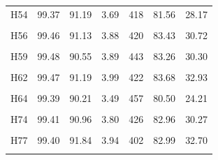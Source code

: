 \documentclass[
  a4paper,
  titlepage]{article}
\begin{document}
\begin{longtable}[t]{lllllll}
H54 & 99.37 & 91.19 & 3.69 & 418 & 81.56 & 28.17\\
 
\cellcolor{gray!6}{H55} & \cellcolor{gray!6}{99.44} & \cellcolor{gray!6}{90.84} & \cellcolor{gray!6}{4.83} & \cellcolor{gray!6}{432} & \cellcolor{gray!6}{87.10} & \cellcolor{gray!6}{43.63}\\
 
H56 & 99.46 & 91.13 & 3.88 & 420 & 83.43 & 30.72\\
 
\cellcolor{gray!6}{H58} & \cellcolor{gray!6}{99.48} & \cellcolor{gray!6}{92.24} & \cellcolor{gray!6}{3.56} & \cellcolor{gray!6}{421} & \cellcolor{gray!6}{82.56} & \cellcolor{gray!6}{28.42}\\
 
H59 & 99.48 & 90.55 & 3.89 & 443 & 83.26 & 30.30\\
 
\cellcolor{gray!6}{H61} & \cellcolor{gray!6}{99.42} & \cellcolor{gray!6}{90.86} & \cellcolor{gray!6}{3.54} & \cellcolor{gray!6}{424} & \cellcolor{gray!6}{80.31} & \cellcolor{gray!6}{24.94}\\
 
H62 & 99.47 & 91.19 & 3.99 & 422 & 83.68 & 32.93\\
 
\cellcolor{gray!6}{H63} & \cellcolor{gray!6}{99.32} & \cellcolor{gray!6}{90.73} & \cellcolor{gray!6}{4.25} & \cellcolor{gray!6}{422} & \cellcolor{gray!6}{84.22} & \cellcolor{gray!6}{35.73}\\
 
H64 & 99.39 & 90.21 & 3.49 & 457 & 80.50 & 24.21\\
 
\cellcolor{gray!6}{H70} & \cellcolor{gray!6}{99.45} & \cellcolor{gray!6}{91.13} & \cellcolor{gray!6}{4.17} & \cellcolor{gray!6}{423} & \cellcolor{gray!6}{84.68} & \cellcolor{gray!6}{35.64}\\
 
H74 & 99.41 & 90.96 & 3.80 & 426 & 82.96 & 30.27\\
 
\cellcolor{gray!6}{H76} & \cellcolor{gray!6}{99.48} & \cellcolor{gray!6}{91.77} & \cellcolor{gray!6}{3.85} & \cellcolor{gray!6}{415} & \cellcolor{gray!6}{82.68} & \cellcolor{gray!6}{31.14}\\
 
H77 & 99.40 & 91.84 & 3.94 & 402 & 82.99 & 32.70\\
 
\cellcolor{gray!6}{H80} & \cellcolor{gray!6}{99.45} & \cellcolor{gray!6}{90.19} & \cellcolor{gray!6}{3.69} & \cellcolor{gray!6}{440} & \cellcolor{gray!6}{80.89} & \cellcolor{gray!6}{26.35}\\
 

\end{longtable}
\end{document}
